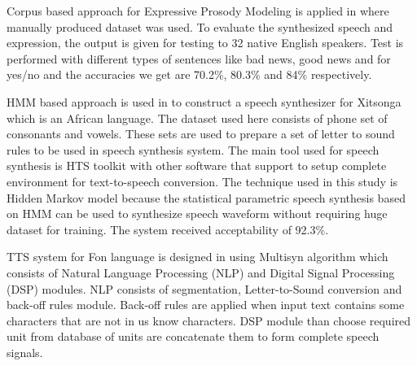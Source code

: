Corpus based approach for Expressive Prosody Modeling is applied in \cite{eide2004corpus} where manually produced dataset was used. To evaluate the synthesized
speech and expression, the output is given for testing to 32 native English speakers. Test is performed with different types of sentences like bad news, good news and for yes/no and the accuracies we get are 70.2\%, 80.3\% and 84\% respectively.


HMM based approach is used in \cite{baloyi2012text} to construct a speech synthesizer for Xitsonga which is an African language. The dataset used here consists of phone set of consonants and vowels. These sets are used to prepare a set of letter to sound rules to be used in speech synthesis system. The main tool used for speech synthesis is HTS toolkit \cite{hts_2.2} with other software that support to setup complete environment for text-to-speech conversion. The technique used in this study is Hidden Markov model because the statistical parametric speech synthesis based on HMM can be used to synthesize speech waveform without requiring huge dataset for training. The system received acceptability of 92.3\%. 

TTS system for Fon language is designed in \cite{dagba2014text} using Multisyn algorithm \cite{clark2007multisyn} which consists of Natural Language Processing (NLP) and Digital Signal Processing (DSP) modules. NLP consists of segmentation, Letter-to-Sound conversion and back-off rules module. Back-off rules are applied when input text contains some characters that are not in us know characters. DSP module than choose required unit from database of units are concatenate them to form complete speech signals.

